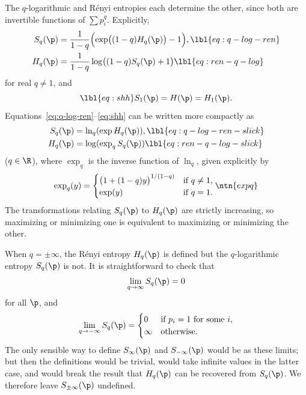 The $q$-logarithmic%
% 
%
% 
and R\'enyi entropies each determine the other, since
both are invertible functions of $\sum p_i^q$.  Explicitly, 
% 
\begin{align}
S_q(\p) &
=
\frac{1}{1 - q} \Bigl( \exp\bigl((1 - q) H_q(\p)\bigr) - 1 \Bigr),
\lbl{eq:q-log-ren}    \\
H_q(\p) &
=
\frac{1}{1 - q} \log \bigl( (1 - q) S_q(\p) + 1 \bigr)
\lbl{eq:ren-q-log}
\end{align}
% 
for real $q \neq 1$, and 
% 
\begin{equation}
\lbl{eq:shh}
S_1(\p) = H(\p) = H_1(\p).
\end{equation}
% 
Equations~\eqref{eq:q-log-ren}--\eqref{eq:shh} can be written more
compactly as 
% 
\begin{align}
S_q(\p) & 
= 
\ln_q (\exp H_q(\p)),   
\lbl{eq:q-log-ren-slick}      \\
H_q(\p) & 
= 
\log (\exp_q S_q(\p))
\lbl{eq:ren-q-log-slick}
\end{align}
% 
($q \in \R$), where $\exp_q$ is the inverse%
%
% 
function of $\ln_q$, given explicitly by
\[
\exp_q(y)
=
\begin{cases}
\bigl( 1 + (1 - q)y \bigr)^{1/(1 - q)}  &\text{if } q \neq 1,   \\
\exp(y)                                 &\text{if } q = 1.
\end{cases}
\ntn{expq}
\]
The transformations relating $S_q(\p)$ to $H_q(\p)$ are strictly
increasing, so maximizing or minimizing one is equivalent to maximizing or
minimizing the other.

\begin{remark}
When $q = \pm\infty$, the R\'enyi entropy $H_q(\p)$ is defined but the
$q$-logarithmic entropy $S_q(\p)$ is not.  It is straightforward to check
that
\[
\lim_{q \to \infty} S_q(\p) = 0
\]
for all $\p$, and 
\[
\lim_{q \to -\infty} S_q(\p)
=
\begin{cases}
0       &\text{if } p_i = 1 \text{ for some } i,        \\
\infty  &\text{otherwise}.
\end{cases}
\]
The only sensible way to define $S_\infty(\p)$ and $S_{-\infty}(\p)$ would
be as these limits; but then the definitions would be trivial, would take
infinite values in the latter case, and would break the result that
$H_q(\p)$ can be recovered from $S_q(\p)$.  We therefore leave
$S_{\pm\infty}(\p)$ undefined.
\end{remark}

